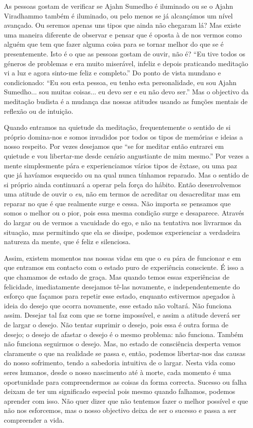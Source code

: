 As pessoas gostam de verificar se Ajahn Sumedho é iluminado ou se o
Ajahn Viradhammo também é iluminado, ou pelo menos se já alcançámos um
nível avançado. Ou seremos apenas uns tipos que ainda não chegaram lá?
Mas existe uma maneira diferente de observar e pensar que é oposta à de
nos vermos como alguém que tem que fazer alguma coisa para se tornar
melhor do que se é presentemente. Isto é o que as pessoas gostam de
ouvir, não é? ``Eu tive todos os géneros de problemas e era muito
miserável, infeliz e depois praticando meditação vi a luz e agora
sinto-me feliz e completo.'' Do ponto de vista mundano e condicionado:
``Eu sou esta pessoa, eu tenho esta personalidade, eu sou Ajahn
Sumedho... sou muitas coisas... eu devo ser e eu não devo ser.'' Mas o
objectivo da meditação budista é a mudança das nossas atitudes usando as
funções mentais de reflexão ou de intuição.

Quando entramos na quietude da meditação, frequentemente o sentido de si
próprio domina-nos e somos invadidos por todos os tipos de memórias e
ideias a nosso respeito. Por vezes desejamos que ``se for meditar então
entrarei em quietude e vou libertar-me desde cenário angustiante de mim
mesmo.'' Por vezes a mente simplesmente pára e experienciamos vários
tipos de êxtase, ou uma paz que já havíamos esquecido ou na qual nunca
tínhamos reparado. Mas o sentido de si próprio ainda continuará a operar
pela força do hábito. Então desenvolvemos uma atitude de ouvir o
\emph{eu}, não em termos de acreditar ou desacreditar mas em reparar no
que é que realmente surge e cessa. Não importa se pensamos que somos o
melhor ou o pior, pois essa mesma condição surge e desaparece. Através
do largar ou de vermos a vacuidade do ego, e não na tentativa nos
livrarmos da situação, mas permitindo que ela se dissipe, podemos
experienciar a verdadeira natureza da mente, que é feliz e silenciosa.

Assim, existem momentos nas nossas vidas em que o \emph{eu} pára de
funcionar e em que entramos em contacto com o estado puro de experiência
consciente. É isso a que chamamos de estado de graça. Mas quando temos
essas experiências de felicidade, imediatamente desejamos tê-las
novamente, e independentemente do esforço que façamos para repetir esse
estado, enquanto estivermos apegados à ideia do desejo que ocorra
novamente, esse estado não voltará. Não funciona assim. Desejar tal faz
com que se torne impossível, e assim a atitude deverá ser de largar o
desejo. Não tentar suprimir o desejo, pois essa é outra forma de desejo;
o desejo de afastar o desejo é o mesmo problema: não funciona. Também
não funciona seguirmos o desejo. Mas, no estado de consciência desperta
vemos claramente o que na realidade se passa e, então, podemos
libertar-nos das causas do nosso sofrimento, tendo a sabedoria intuitiva
de o largar. Nesta vida como seres humanos, desde o nosso nascimento até
à morte, cada momento é uma oportunidade para compreendermos as coisas
da forma correcta. Sucesso ou falha deixam de ter um significado
especial pois mesmo quando falhamos, podemos aprender com isso. Não quer
dizer que não tentemos fazer o melhor possível e que não nos esforcemos,
mas o nosso objectivo deixa de ser o sucesso e passa a ser compreender a
vida.

